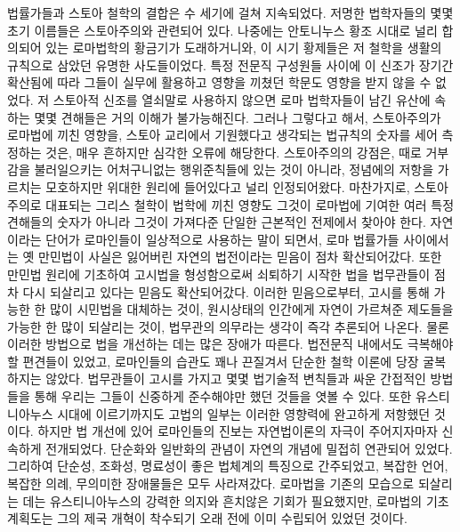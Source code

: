 법률가들과 스토아 철학의 결합은 수 세기에 걸쳐 지속되었다.
저명한 법학자들의 몇몇 초기 이름들은 스토아주의와 관련되어 있다.
나중에는 안토니누스 황조 시대로 널리 합의되어 있는
로마법학의 황금기가 도래하거니와,
이 시기 황제들은 저 철학을 생활의 규칙으로 삼았던 유명한 사도들이었다.
특정 전문직 구성원들 사이에 이 신조가 장기간 확산됨에 따라
그들이 실무에 활용하고 영향을 끼쳤던 학문도 영향을 받지 않을 수 없었다.
저 스토아적 신조를 열쇠말로 사용하지 않으면
로마 법학자들이 남긴 유산에 속하는 몇몇 견해들은 거의 이해가 불가능해진다.
그러나 그렇다고 해서,
스토아주의가 로마법에 끼친 영향을,
스토아 교리에서 기원했다고 생각되는 법규칙의 숫자를 세어 측정하는 것은,
매우 흔하지만 심각한 오류에 해당한다.
스토아주의의 강점은,
때로 거부감을 불러일으키는 어처구니없는 행위준칙들에 있는 것이 아니라,
정념에의 저항을 가르치는 모호하지만 위대한 원리에 들어있다고 널리 인정되어왔다.
마찬가지로, 스토아주의로 대표되는 그리스 철학이 법학에 끼친 영향도
그것이 로마법에 기여한 여러 특정 견해들의 숫자가 아니라
그것이 가져다준 단일한 근본적인 전제에서 찾아야 한다.
자연이라는 단어가 로마인들이 일상적으로 사용하는 말이 되면서,
로마 법률가들 사이에서는
옛 만민법이 사실은 잃어버린 자연의 법전이라는 믿음이
점차 확산되어갔다.
또한 만민법 원리에 기초하여 고시법을 형성함으로써
쇠퇴하기 시작한 법을 법무관들이 점차 다시 되살리고 있다는 믿음도 확산되어갔다.
이러한 믿음으로부터,
고시를 통해 가능한 한 많이 시민법을 대체하는 것이,
원시상태의 인간에게 자연이 가르쳐준 제도들을 가능한 한 많이 되살리는 것이,
법무관의 의무라는 생각이 즉각 추론되어 나온다.
물론 이러한 방법으로 법을 개선하는 데는 많은 장애가 따른다.
법전문직 내에서도 극복해야할 편견들이 있었고,
로마인들의 습관도 꽤나 끈질겨서 단순한 철학 이론에 당장 굴복하지는 않았다.
법무관들이 고시를 가지고 몇몇 법기술적 변칙들과 싸운 간접적인 방법들을 통해
우리는 그들이 신중하게 준수해야만 했던 것들을 엿볼 수 있다.
또한 유스티니아누스 시대에 이르기까지도 고법의 일부는
이러한 영향력에 완고하게 저항했던 것이다.
하지만 법 개선에 있어 로마인들의 진보는
자연법이론의 자극이 주어지자마자 신속하게 전개되었다.
단순화와 일반화의 관념이 자연의 개념에 밀접히 연관되어 있었다.
그리하여 단순성, 조화성, 명료성이 좋은 법체계의 특징으로 간주되었고,
복잡한 언어, 복잡한 의례, 무의미한 장애물들은
모두 사라져갔다.
로마법을 기존의 모습으로 되살리는 데는
유스티니아누스의 강력한 의지와 흔치않은 기회가 필요했지만,
로마법의 기초 계획도는 그의 제국 개혁이 착수되기 오래 전에
이미 수립되어 있었던 것이다.

